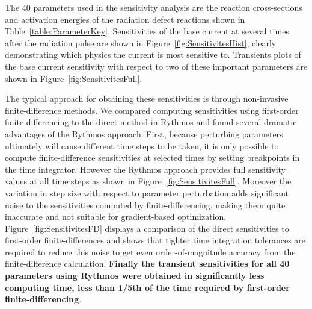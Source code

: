 \documentclass[pdf,ps2pdf,11pt]{SANDreport}
\begin{document}
The 40 parameters used in the sensitivity analysis are the reaction 
cross-sections and activation energies of the radiation defect reactions
shown in Table~\ref{table:ParameterKey}.  Sensitivities of the base current
at several times after the radiation pulse are shown in 
Figure~\ref{fig:SensitivitesHist}, clearly demonstrating which physics the
current is most sensitive to.  Transients plots of the base current
sensitivity with respect to two of these important parameters are shown in
Figure~\ref{fig:SensitivitesFull}.

The typical approach for obtaining these sensitivities is through 
non-invasive finite-difference methods.  We compared computing 
sensitivities using first-order finite-differencing to the direct method
in Rythmos and found  several dramatic advantages of the Rythmos approach.
First, because perturbing parameters ultimately will cause different time
steps to be taken, it is only possible to compute finite-difference 
sensitivities at selected times by setting breakpoints in the time integrator.
However the Rythmos approach provides full sensitivity values at all time
steps as shown in Figure~\ref{fig:SensitivitesFull}.  Moreover the variation
in step size with respect to parameter perturbation adds significant noise
to the sensitivities computed by finite-differencing, making them quite 
inaccurate and not suitable for gradient-based optimization.  
Figure~\ref{fig:SensitivitesFD} displays a comparison of the direct 
sensitivities to first-order finite-differences and shows that tighter 
time integration tolerances are required to reduce this noise to get even 
order-of-magnitude accuracy from the finite-difference calculation.  
{\bf Finally the
transient sensitivities for all 40 parameters using Rythmos were obtained in 
significantly less computing time, less than 1/5th of the time required by
first-order finite-differencing}.





\end{document}
